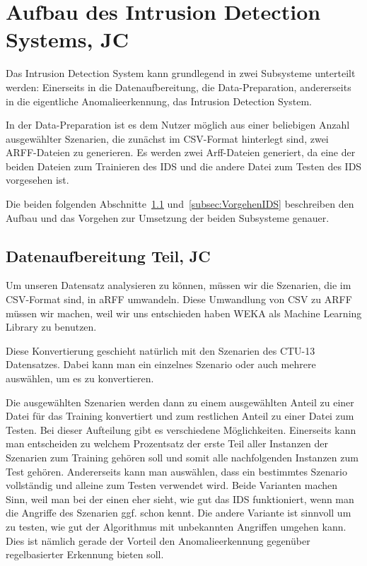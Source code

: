 \documentclass[main.tex]{subfiles}
\begin{document}
\section{Aufbau des Intrusion Detection Systems, JC}

Das Intrusion Detection System kann grundlegend in zwei Subsysteme unterteilt werden: Einerseits in die Datenaufbereitung, die Data-Preparation, andererseits in die eigentliche Anomalieerkennung, das Intrusion Detection System.

In der Data-Preparation ist es dem Nutzer möglich aus einer beliebigen Anzahl
ausgewählter Szenarien, die zunächst im CSV-Format hinterlegt sind, zwei
ARFF-Dateien zu generieren. Es werden zwei Arff-Dateien generiert, da eine der
beiden Dateien zum Trainieren des IDS und die andere Datei zum Testen des IDS
vorgesehen ist.

Die beiden folgenden Abschnitte~\ref{subsec:VorgehenDatenaufbereitung}
und~\ref{subsec:VorgehenIDS} beschreiben den Aufbau und das Vorgehen zur
Umsetzung der beiden Subsysteme genauer.

\subsection{Datenaufbereitung Teil, JC} \label{subsec:VorgehenDatenaufbereitung}

Um unseren Datensatz analysieren zu können, müssen wir die Szenarien, die im CSV-Format sind, in aRFF umwandeln.
Diese Umwandlung von CSV zu ARFF müssen wir machen, weil wir uns entschieden
haben WEKA als Machine Learning Library zu benutzen.

Diese Konvertierung geschieht natürlich mit den Szenarien des CTU-13
Datensatzes.
Dabei kann man ein einzelnes Szenario oder auch mehrere auswählen, um es zu
konvertieren.

Die ausgewählten Szenarien werden dann zu einem ausgewählten Anteil zu einer Datei
für das Training konvertiert und zum restlichen Anteil zu einer Datei zum Testen.
Bei dieser Aufteilung gibt es verschiedene Möglichkeiten. Einerseits kann man
entscheiden zu welchem Prozentsatz der erste Teil aller Instanzen der
Szenarien zum Training gehören soll und somit alle nachfolgenden Instanzen zum
Test gehören.
Andererseits kann man auswählen, dass ein bestimmtes Szenario vollständig und
alleine zum Testen verwendet wird.
Beide Varianten machen Sinn, weil man bei der einen eher sieht, wie gut das IDS
funktioniert, wenn man die Angriffe des Szenarien ggf. schon kennt.
Die andere Variante ist sinnvoll um zu testen, wie gut der Algorithmus mit
unbekannten Angriffen umgehen kann. Dies ist nämlich gerade der Vorteil den
Anomalieerkennung gegenüber regelbasierter Erkennung bieten soll.
\end{document}
